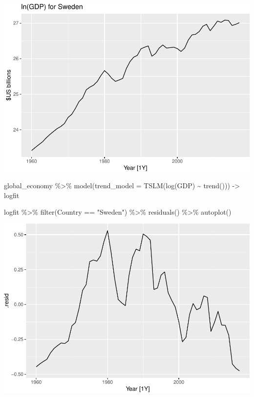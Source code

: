 \documentclass[
]{book}
\newenvironment{Shaded}{\begin{snugshade}}{\end{snugshade}}
\newcommand{\AttributeTok}[1]{\textcolor[rgb]{0.77,0.63,0.00}{#1}}
\newcommand{\FunctionTok}[1]{\textcolor[rgb]{0.00,0.00,0.00}{#1}}
\newcommand{\NormalTok}[1]{#1}
\newcommand{\OtherTok}[1]{\textcolor[rgb]{0.56,0.35,0.01}{#1}}
\newcommand{\SpecialCharTok}[1]{\textcolor[rgb]{0.00,0.00,0.00}{#1}}
\newcommand{\StringTok}[1]{\textcolor[rgb]{0.31,0.60,0.02}{#1}}
\begin{document}
\includegraphics{graphics/unnamed-chunk-29-1.pdf}

\begin{Shaded}
\begin{Highlighting}[]
\NormalTok{global\_economy }\SpecialCharTok{\%\textgreater{}\%}
  \FunctionTok{model}\NormalTok{(}\AttributeTok{trend\_model =} \FunctionTok{TSLM}\NormalTok{(}\FunctionTok{log}\NormalTok{(GDP) }\SpecialCharTok{\textasciitilde{}} \FunctionTok{trend}\NormalTok{())) }\OtherTok{{-}\textgreater{}}\NormalTok{ logfit}
\end{Highlighting}
\end{Shaded}

\begin{Shaded}
\begin{Highlighting}[]
\NormalTok{logfit }\SpecialCharTok{\%\textgreater{}\%} \FunctionTok{filter}\NormalTok{(Country }\SpecialCharTok{==} \StringTok{"Sweden"}\NormalTok{) }\SpecialCharTok{\%\textgreater{}\%} \FunctionTok{residuals}\NormalTok{() }\SpecialCharTok{\%\textgreater{}\%} \FunctionTok{autoplot}\NormalTok{()}
\end{Highlighting}
\end{Shaded}

\includegraphics{graphics/unnamed-chunk-31-1.pdf}
\end{document}
